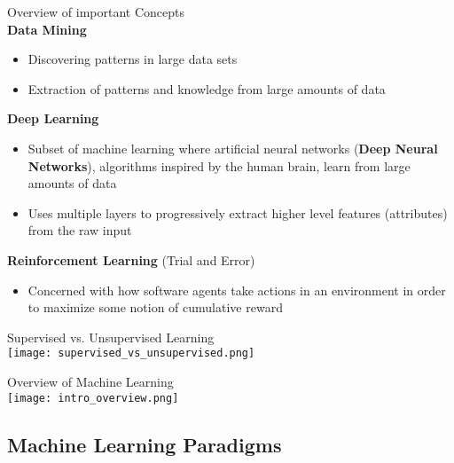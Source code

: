 \begin{theorem}{Overview of important Concepts}\\
    \textcolor{frog}{\textbf{Data Mining}}
    \begin{itemize}
        \item Discovering patterns in large data sets
        \item Extraction of patterns and knowledge from large amounts of data
    \end{itemize}
    \textcolor{frog}{\textbf{Deep Learning}}
    \begin{itemize}
        \item Subset of machine learning where artificial neural networks (\textcolor{frog}{\textbf{Deep Neural Networks}}), algorithms inspired by the human brain, learn from large amounts of data
        \item Uses multiple layers to progressively extract higher level features (attributes) from the raw input
    \end{itemize}
    \textcolor{frog}{\textbf{Reinforcement Learning}} (Trial and Error)
    \begin{itemize}
        \item Concerned with how software agents take actions in an environment in order to maximize some notion of cumulative reward
    \end{itemize}
\end{theorem}

\begin{concept}{Supervised vs. Unsupervised Learning}\\
    \texttt{[image: supervised\_vs\_unsupervised.png]}
\end{concept}

\raggedcolumns

\multend

\begin{concept}{Overview of Machine Learning}\\
    \texttt{[image: intro\_overview.png]}
\end{concept}

\columnbreak

\subsection{Machine Learning Paradigms}

